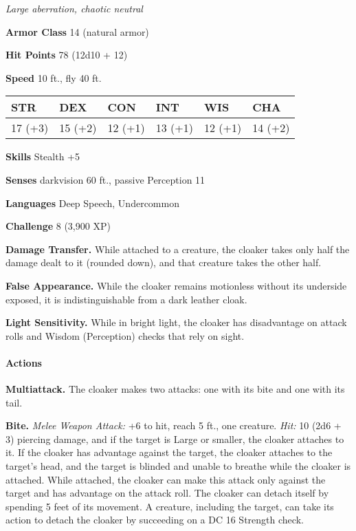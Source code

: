 \documentclass[
]{article}
\begin{document}
\emph{Large aberration, chaotic neutral}

\textbf{Armor Class} 14 (natural armor)

\textbf{Hit Points} 78 (12d10 + 12)

\textbf{Speed} 10 ft., fly 40 ft.

\begin{longtable}[]{@{}llllll@{}}
\toprule
STR & DEX & CON & INT & WIS & CHA\tabularnewline
\midrule
\endhead
17 (+3) & 15 (+2) & 12 (+1) & 13 (+1) & 12 (+1) & 14 (+2)\tabularnewline
\bottomrule
\end{longtable}

\textbf{Skills} Stealth +5

\textbf{Senses} darkvision 60 ft., passive Perception 11

\textbf{Languages} Deep Speech, Undercommon

\textbf{Challenge} 8 (3,900 XP)

\textbf{Damage Transfer.} While attached to a creature, the cloaker
takes only half the damage dealt to it (rounded down), and that creature
takes the other half.

\textbf{False Appearance.} While the cloaker remains motionless without
its underside exposed, it is indistinguishable from a dark leather
cloak.

\textbf{Light Sensitivity.} While in bright light, the cloaker has
disadvantage on attack rolls and Wisdom (Perception) checks that rely on
sight.

\hypertarget{actions-3}{%
\paragraph{Actions}\label{actions-3}}

\textbf{Multiattack.} The cloaker makes two attacks: one with its bite
and one with its tail.

\textbf{Bite.} \emph{Melee Weapon Attack:} +6 to hit, reach 5 ft., one
creature. \emph{Hit:} 10 (2d6 + 3) piercing damage, and if the target is
Large or smaller, the cloaker attaches to it. If the cloaker has
advantage against the target, the cloaker attaches to the target's head,
and the target is blinded and unable to breathe while the cloaker is
attached. While attached, the cloaker can make this attack only against
the target and has advantage on the attack roll. The cloaker can detach
itself by spending 5 feet of its movement. A creature, including the
target, can take its action to detach the cloaker by succeeding on a DC
16 Strength check.
\end{document}

